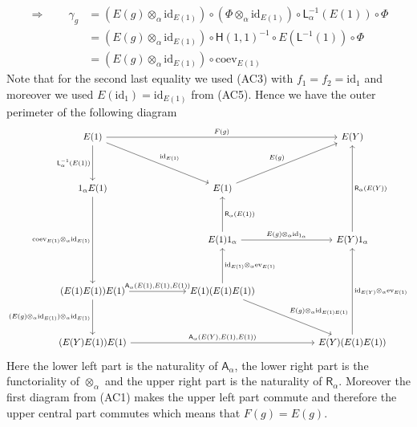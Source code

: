 \begin{prf}
\begin{align*}
  \Rightarrow
  \qquad
  \gamma_{g}
  &=
  \left(
    E(g)
    \otimes_{\alpha}
    \mathrm{id}_{E(1)}
  \right)
  \circ
  \left(
    \Phi
    \otimes_{\alpha}
    \mathrm{id}_{E(1)}
  \right)
  \circ
  \mathsf{L}_{\alpha}^{-1}(E(1))
  \circ
  \Phi
  \\
  &=
  \left(
    E(g)
    \otimes_{\alpha}
    \mathrm{id}_{E(1)}
  \right)
  \circ
  \mathsf{H}(1,1)^{-1}
  \circ
  E(\mathsf{L}^{-1}(1))
  \circ
  \Phi
  \\
  &=
  \left(
    E(g)
    \otimes_{\alpha}
    \mathrm{id}_{E(1)}
  \right)
  \circ
  \mathrm{coev}_{E(1)}
\end{align*}
Note that for the second last equality we used (AC3) with $f_{1} = f_{2} = \mathrm{id}_{1}$ and moreover we used $E(\mathrm{id}_{1}) = \mathrm{id}_{E(1)}$ from (AC5). Hence we have the outer perimeter of the following diagram
\begin{equation*}
\begin{tikzcd}[row sep=3.8em,column sep=6em]
  E(1)
  \ar{rr}{F(g)}
  \ar{rd}{\mathrm{id}_{E(1)}}
  \ar{d}[swap]{\mathsf{L}_{\alpha}^{-1}(E(1))}
  &
  &
  E(Y)
  \\
  1_{\alpha} E(1)
  \ar{dd}[swap]{\mathrm{coev}_{E(1)} \otimes_{\alpha} \mathrm{id}_{E(1)}}
  &
  E(1)
  \ar{ur}{E(g)}
  &
  \\
  &
  E(1) 1_{\alpha}
  \ar{u}[swap]{\mathsf{R}_{\alpha}(E(1))}
  \ar{r}{E(g) \otimes_{\alpha} \mathrm{id}_{1_{\alpha}}}
  &
  E(Y) 1_{\alpha}
  \ar{uu}[swap]{\mathsf{R}_{\alpha}(E(Y))}
  \\
  (E(1) E(1)) E(1)
  \ar{r}{\mathsf{A}_{\alpha}(E(1),E(1),E(1))}
  \ar{d}[swap]{(E(g) \otimes_{\alpha} \mathrm{id}_{E(1)}) \otimes_{\alpha} \mathrm{id}_{E(1)}}
  &
  E(1) (E(1) E(1))
  \ar{u}[swap]{\mathrm{id}_{E(1)} \otimes_{\alpha} \mathrm{ev}_{E(1)}}
  \ar{rd}{E(g) \otimes_{\alpha} \mathrm{id}_{E(1) E(1)}}
  &
  \\
  (E(Y) E(1)) E(1)
  \ar{rr}{\mathsf{A}_{\alpha}(E(Y),E(1),E(1))}
  &
  &
  E(Y) (E(1) E(1))
  \ar{uu}[swap]{\mathrm{id}_{E(Y)} \otimes_{\alpha} \mathrm{ev}_{E(1)}}
\end{tikzcd}
\end{equation*}
Here the lower left part is the naturality of $\mathsf{A}_{\alpha}$, the lower right part is the functoriality of $\otimes_{\alpha}$ and the upper right part is the naturality of $\mathsf{R}_{\alpha}$. Moreover the first diagram from (AC1) makes the upper left part commute and therefore the upper central part commutes which means that $F(g) = E(g)$.
\\\\

\end{prf}
